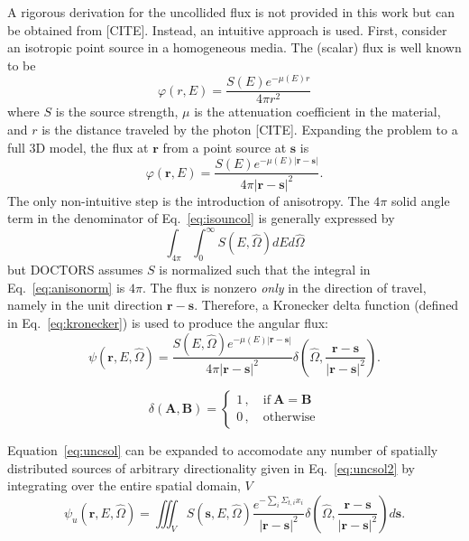 A rigorous derivation for the uncollided flux is not provided in this work but can be obtained from [CITE]. Instead, an intuitive approach is used. First, consider an isotropic point source in a homogeneous media. The (scalar) flux is well known to be
\begin{equation}
\varphi(r, E) = \frac{S(E) e^{-\mu(E) r}}{4 \pi r^2}
\end{equation}
where $S$ is the source strength, $\mu$ is the attenuation coefficient in the material, and $r$ is the distance traveled by the photon [CITE]. Expanding the problem to a full 3D model, the flux at $\boldsymbol{r}$ from a point source at $\boldsymbol{s}$ is
\begin{equation}\label{eq:isouncol}
\varphi(\boldsymbol{r}, E) = \frac{S(E) e^{-\mu(E) |\boldsymbol{r}-\boldsymbol{s}|}}{4 \pi |\boldsymbol{r}-\boldsymbol{s}|^2}.
\end{equation}
The only non-intuitive step is the introduction of anisotropy. The $4 \pi$ solid angle term in the denominator of Eq.~\ref{eq:isouncol} is generally expressed by
\begin{equation}\label{eq:anisonorm}
\int_{4 \pi}^{} \int_{0}^{\infty} S(E, \hat{\Omega}) dE d\hat{\Omega}
\end{equation}
but DOCTORS assumes $S$ is normalized such that the integral in Eq.~\ref{eq:anisonorm} is $4 \pi$. The flux is nonzero \textit{only} in the direction of travel, namely in the unit direction $\boldsymbol{r} - \boldsymbol{s}$. Therefore, a Kronecker delta function (defined in Eq.~\ref{eq:kronecker}) is used to produce the angular flux:
\begin{equation}\label{eq:uncsol}
\psi(\boldsymbol{r}, E, \hat{\Omega}) = \frac{S(E, \hat{\Omega}) e^{-\mu(E) |\boldsymbol{r}-\boldsymbol{s}|}}{4 \pi |\boldsymbol{r}-\boldsymbol{s}|^2} \delta \left( \hat{\Omega}, \frac{\boldsymbol{r} - \boldsymbol{s}}{|\boldsymbol{r} - \boldsymbol{s}|^2}\right).
\end{equation}

\begin{equation} \label{eq:kronecker}
\delta(\boldsymbol{A}, \boldsymbol{B}) = 
\begin{cases}
1 \,, \quad \mathrm{if} \ \boldsymbol{A}=\boldsymbol{B} \\
0 \,, \quad \mathrm{otherwise}
\end{cases}
\end{equation}

Equation~\ref{eq:uncsol} can be expanded to accomodate any number of spatially distributed sources of arbitrary directionality given in Eq.~\ref{eq:uncsol2} by integrating over the entire spatial domain, $V$
\begin{equation} \label{eq:uncsol2}
\psi_u(\boldsymbol{r}, E, \hat{\Omega}) = \iiint_{V}
S(\boldsymbol{s}, E, \hat{\Omega})
\frac{e^{-\sum_i \Sigma_{t,i} x_i}}{|\boldsymbol{r}-\boldsymbol{s}|^2}
\delta\left( \hat{\Omega}, \frac{\boldsymbol{r}-\boldsymbol{s}}{|\boldsymbol{r}-\boldsymbol{s}|^2}\right)
d \boldsymbol{s}.
\end{equation}

